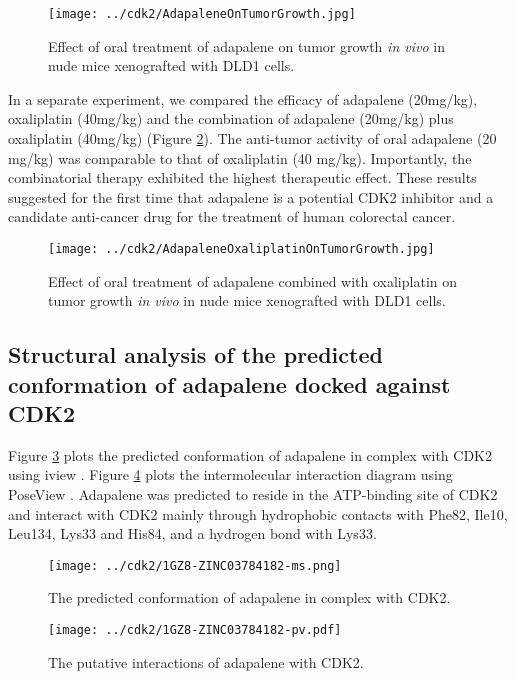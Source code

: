 \begin{figure}
\centering
\texttt{[image: ../cdk2/AdapaleneOnTumorGrowth.jpg]}
\caption{Effect of oral treatment of adapalene on tumor growth \textit{in vivo} in nude mice xenografted with DLD1 cells.}
\label{cdk2:AdapaleneOnTumorGrowth}
\end{figure}

In a separate experiment, we compared the efficacy of adapalene (20mg/kg), oxaliplatin (40mg/kg) and the combination of adapalene (20mg/kg) plus oxaliplatin (40mg/kg) (Figure \ref{cdk2:AdapaleneOxaliplatinOnTumorGrowth}). The anti-tumor activity of oral adapalene (20 mg/kg) was comparable to that of oxaliplatin (40 mg/kg). Importantly, the combinatorial therapy exhibited the highest therapeutic effect. These results suggested for the first time that adapalene is a potential CDK2 inhibitor and a candidate anti-cancer drug for the treatment of human colorectal cancer.

\begin{figure}
\centering
\texttt{[image: ../cdk2/AdapaleneOxaliplatinOnTumorGrowth.jpg]}
\caption{Effect of oral treatment of adapalene combined with oxaliplatin on tumor growth \textit{in vivo} in nude mice xenografted with DLD1 cells.}
\label{cdk2:AdapaleneOxaliplatinOnTumorGrowth}
\end{figure}

\subsection{Structural analysis of the predicted conformation of adapalene docked against CDK2}

Figure \ref{cdk2:1GZ8-ZINC03784182-ms} plots the predicted conformation of adapalene in complex with CDK2 using iview \citep{1366}. Figure \ref{cdk2:1GZ8-ZINC03784182-pv} plots the intermolecular interaction diagram using PoseView \citep{748}. Adapalene was predicted to reside in the ATP-binding site of CDK2 and interact with CDK2 mainly through hydrophobic contacts with Phe82, Ile10, Leu134, Lys33 and His84, and a hydrogen bond with Lys33.

\begin{figure}
\centering
\texttt{[image: ../cdk2/1GZ8-ZINC03784182-ms.png]}
\caption{The predicted conformation of adapalene in complex with CDK2.}
\label{cdk2:1GZ8-ZINC03784182-ms}
\end{figure}

\begin{figure}
\centering
\texttt{[image: ../cdk2/1GZ8-ZINC03784182-pv.pdf]}
\caption{The putative interactions of adapalene with CDK2.}
\label{cdk2:1GZ8-ZINC03784182-pv}
\end{figure}

